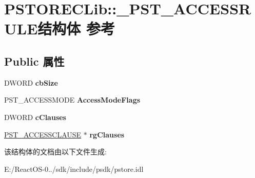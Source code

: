 \hypertarget{struct_p_s_t_o_r_e_c_lib_1_1___p_s_t___a_c_c_e_s_s_r_u_l_e}{}\section{P\+S\+T\+O\+R\+E\+C\+Lib\+:\+:\+\_\+\+P\+S\+T\+\_\+\+A\+C\+C\+E\+S\+S\+R\+U\+L\+E结构体 参考}
\label{struct_p_s_t_o_r_e_c_lib_1_1___p_s_t___a_c_c_e_s_s_r_u_l_e}
\subsection*{Public 属性}
\begin{DoxyCompactItemize}
\item 
\mbox{\label{struct_p_s_t_o_r_e_c_lib_1_1___p_s_t___a_c_c_e_s_s_r_u_l_e_a3ccfa8df398144b1906c6bded6d7952e}} 
D\+W\+O\+RD {\bfseries cb\+Size}
\item 
\mbox{\label{struct_p_s_t_o_r_e_c_lib_1_1___p_s_t___a_c_c_e_s_s_r_u_l_e_a3f7e214f4ff304921b96a6078e20090a}} 
P\+S\+T\+\_\+\+A\+C\+C\+E\+S\+S\+M\+O\+DE {\bfseries Access\+Mode\+Flags}
\item 
\mbox{\label{struct_p_s_t_o_r_e_c_lib_1_1___p_s_t___a_c_c_e_s_s_r_u_l_e_a972e87171138eedebf673b61269ec1e2}} 
D\+W\+O\+RD {\bfseries c\+Clauses}
\item 
\mbox{\label{struct_p_s_t_o_r_e_c_lib_1_1___p_s_t___a_c_c_e_s_s_r_u_l_e_a21d4329ac78d27743066cd7b28071ee2}} 
\hyperlink{struct_p_s_t_o_r_e_c_lib_1_1___p_s_t___a_c_c_e_s_s_c_l_a_u_s_e}{P\+S\+T\+\_\+\+A\+C\+C\+E\+S\+S\+C\+L\+A\+U\+SE} $\ast$ {\bfseries rg\+Clauses}
\end{DoxyCompactItemize}


该结构体的文档由以下文件生成\+:\begin{DoxyCompactItemize}
\item 
E\+:/\+React\+O\+S-\/0../sdk/include/psdk/pstore.\+idl\end{DoxyCompactItemize}
